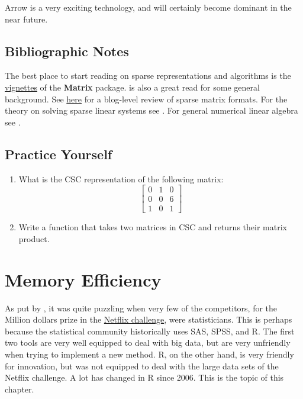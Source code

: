 \documentclass[]{book}
\theoremstyle{definition}
\theoremstyle{definition}
\theoremstyle{definition}
\theoremstyle{remark}
\begin{document}
Arrow is a very exciting technology, and will certainly become dominant
in the near future.

\section{Bibliographic Notes}\label{bibliographic-notes-12}

The best place to start reading on sparse representations and algorithms
is the
\href{https://cran.r-project.org/web/packages/Matrix/vignettes/Intro2Matrix.pdf}{vignettes}
of the \textbf{Matrix} package. \citet{gilbert1992sparse} is also a
great read for some general background. See
\href{http://netlib.org/linalg/html_templates/node90.html}{here} for a
blog-level review of sparse matrix formats. For the theory on solving
sparse linear systems see \citet{davis2006direct}. For general numerical
linear algebra see \citet{gentle2012numerical}.

\section{Practice Yourself}\label{practice-yourself-10}

\begin{enumerate}
\def\labelenumi{\arabic{enumi}.}
\item
  What is the CSC representation of the following matrix:
  \[\begin{bmatrix}
  0 & 1 & 0 \\
  0 & 0 & 6 \\
  1 & 0 & 1 
  \end{bmatrix}\]
\item
  Write a function that takes two matrices in CSC and returns their
  matrix product.
\end{enumerate}

\chapter{Memory Efficiency}\label{memory}

As put by \citet{kane2013scalable}, it was quite puzzling when very few
of the competitors, for the Million dollars prize in the
\href{https://en.wikipedia.org/wiki/Netflix_Prize}{Netflix challenge},
were statisticians. This is perhaps because the statistical community
historically uses SAS, SPSS, and R. The first two tools are very well
equipped to deal with big data, but are very unfriendly when trying to
implement a new method. R, on the other hand, is very friendly for
innovation, but was not equipped to deal with the large data sets of the
Netflix challenge. A lot has changed in R since 2006. This is the topic
of this chapter.
\end{document}
